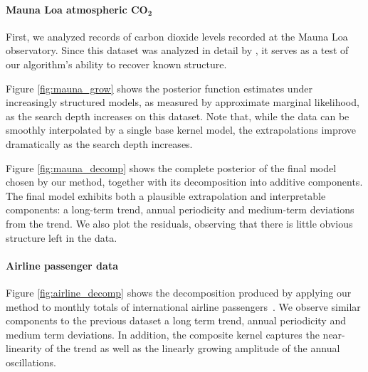 \documentclass[twoside]{article}
\begin{document}
\label{sec:extrapolation}
\paragraph{Mauna Loa atmospheric CO$\mathbf{_{2}}$}


First, we analyzed records of carbon dioxide levels recorded at the Mauna Loa observatory.
Since this dataset was analyzed in detail by \citet{rasmussen38gaussian}, it serves as a test of our algorithm's ability to recover known structure.




Figure \ref{fig:mauna_grow} shows the posterior function estimates under increasingly structured models, as measured by approximate marginal likelihood, as the search depth increases on this dataset.
%
%
Note that, while the data can be smoothly interpolated by a single base kernel model, the extrapolations improve dramatically as the search depth increases.


Figure \ref{fig:mauna_decomp} shows the complete posterior of the final model chosen by our method, together with its decomposition into additive components.
The final model exhibits both a plausible extrapolation and interpretable components: a long-term trend, annual periodicity and medium-term deviations from the trend.
We also plot the residuals, observing that there is little obvious structure left in the data.



\paragraph{Airline passenger data}



Figure \ref{fig:airline_decomp} shows the decomposition produced by applying our method to monthly totals of international airline passengers~\citep{box2011time}.
We observe similar components to the previous dataset \ie a long term trend, annual periodicity and medium term deviations.
In addition, the composite kernel captures the near-linearity of the trend as well as the linearly growing amplitude of the annual oscillations.
\end{document}

